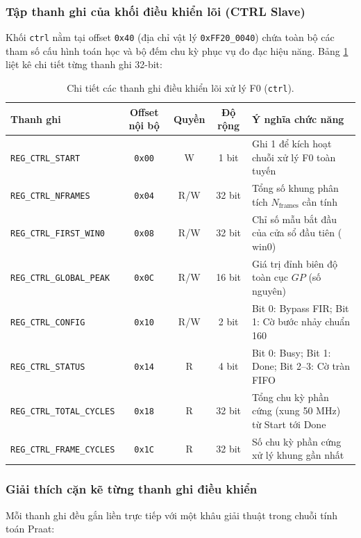 \subsubsection*{Tập thanh ghi của khối điều khiển lõi (CTRL Slave)}
Khối \texttt{ctrl} nằm tại offset \texttt{0x40} (địa chỉ vật lý \texttt{0xFF20\_0040}) chứa toàn bộ các tham số cấu hình toán học và bộ đếm chu kỳ phục vụ đo đạc hiệu năng. Bảng \ref{tab:ch01_ctrl_regs} liệt kê chi tiết từng thanh ghi 32-bit:

\begin{table}[H]
\centering
\caption{Chi tiết các thanh ghi điều khiển lõi xử lý F0 (\texttt{ctrl}).}
\label{tab:ch01_ctrl_regs}
\footnotesize
\setlength{\tabcolsep}{3.5pt}
\begin{tabular}{lcccl}
\toprule
\textbf{Thanh ghi} & \textbf{Offset nội bộ} & \textbf{Quyền} & \textbf{Độ rộng} & \textbf{Ý nghĩa chức năng} \\
\midrule
\texttt{REG\_CTRL\_START}        & \texttt{0x00} & W   & 1 bit  & Ghi 1 để kích hoạt chuỗi xử lý F0 toàn tuyến \\
\texttt{REG\_CTRL\_NFRAMES}      & \texttt{0x04} & R/W & 32 bit & Tổng số khung phân tích $N_{\text{frames}}$ cần tính \\
\texttt{REG\_CTRL\_FIRST\_WIN0}  & \texttt{0x08} & R/W & 32 bit & Chỉ số mẫu bắt đầu của cửa sổ đầu tiên ($\text{win0}$) \\
\texttt{REG\_CTRL\_GLOBAL\_PEAK} & \texttt{0x0C} & R/W & 16 bit & Giá trị đỉnh biên độ toàn cục $GP$ (số nguyên) \\
\texttt{REG\_CTRL\_CONFIG}       & \texttt{0x10} & R/W & 2 bit  & Bit 0: Bypass FIR; Bit 1: Cờ bước nhảy chuẩn 160 \\
\texttt{REG\_CTRL\_STATUS}       & \texttt{0x14} & R   & 4 bit  & Bit 0: Busy; Bit 1: Done; Bit 2--3: Cờ tràn FIFO \\
\texttt{REG\_CTRL\_TOTAL\_CYCLES}& \texttt{0x18} & R   & 32 bit & Tổng chu kỳ phần cứng (xung 50 MHz) từ Start tới Done \\
\texttt{REG\_CTRL\_FRAME\_CYCLES}& \texttt{0x1C} & R   & 32 bit & Số chu kỳ phần cứng xử lý khung gần nhất \\
\bottomrule
\end{tabular}
\end{table}

\subsubsection*{Giải thích cặn kẽ từng thanh ghi điều khiển}
Mỗi thanh ghi đều gắn liền trực tiếp với một khâu giải thuật trong chuỗi tính toán Praat:

